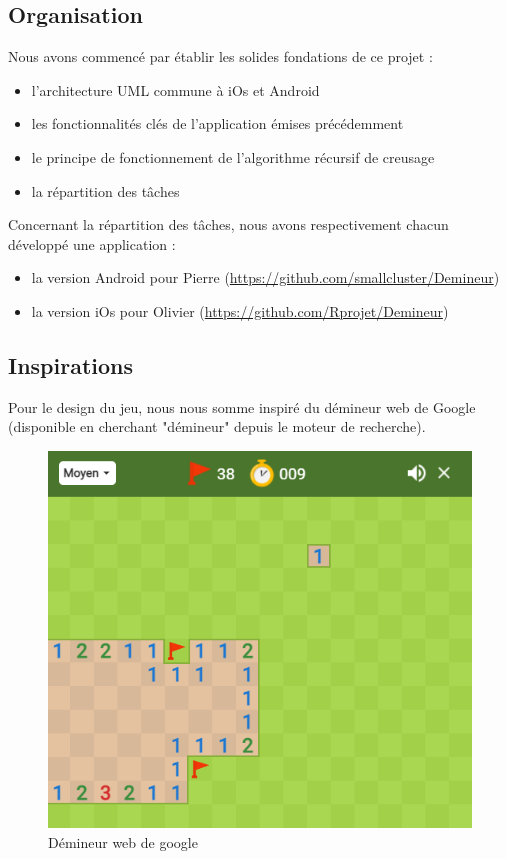 \documentclass{article}
\begin{document}
\subsection{Organisation}

Nous avons commencé par établir les solides fondations de ce projet :
\begin{itemize}
    \item  l'architecture UML commune à iOs et Android
    \item  les fonctionnalités clés de l'application émises précédemment 
    \item  le principe de fonctionnement de l'algorithme récursif de creusage 
    \item  la répartition des tâches 
\end{itemize}

Concernant la répartition des tâches, nous avons respectivement chacun développé une 
application : 
\begin{itemize}
    \item  la version Android pour Pierre (\url{https://github.com/smallcluster/Demineur})
    \item  la version iOs pour Olivier (\url{https://github.com/Rprojet/Demineur})
\end{itemize}

\subsection{Inspirations}
Pour le design du jeu, nous nous somme inspiré du démineur web de Google (disponible en cherchant "démineur" depuis le moteur de recherche).

\begin{figure}[H]
    \centering
    \includegraphics[width=0.7\linewidth]{Ressources/demineurGoogle.png}
    \caption{Démineur web de google}
\end{figure}
\end{document}
